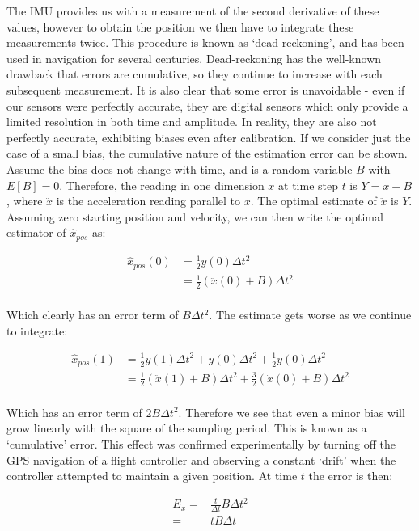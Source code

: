 \documentclass[capstone_report.tex]{subfiles}
\begin{document}
The IMU provides us with a measurement of the second derivative of these values, however to obtain the position we then have to integrate these measurements twice. This procedure is known as `dead-reckoning', and has been used in navigation for several centuries. Dead-reckoning has the well-known drawback that errors are cumulative, so they continue to increase with each subsequent measurement. It is also clear that some error is unavoidable - even if our sensors were perfectly accurate, they are digital sensors which only provide a limited resolution in both time and amplitude. In reality, they are also not perfectly accurate, exhibiting biases even after calibration. If we consider just the case of a small bias, the cumulative nature of the estimation error can be shown.\\ 

Assume the bias does not change with time, and is a random variable $B$ with $E[B]=0$. Therefore, the reading in one dimension $x$ at time step $t$ is $Y=\ddot{x}+B$, where $\ddot{x}$ is the acceleration reading parallel to $x$. The optimal estimate of $\ddot{x}$ is $Y$. Assuming zero starting position and velocity, we can then write the optimal estimator of $\hat{x}_{pos}$ as:

\begin{align*}
	\hat{x}_{pos}(0)&=\frac{1}{2}y(0)\Delta t^2\\
	&=\frac{1}{2}(\ddot{x}(0)+B)\Delta t^2\\
\end{align*}

Which clearly has an error term of $B\Delta t^2$. The estimate gets worse as we continue to integrate:

\begin{align*}
\hat{x}_{pos}(1)&=\frac{1}{2}y(1)\Delta t^2+y(0)\Delta t^2+\frac{1}{2}y(0)\Delta t^2\\
&=\frac{1}{2}(\ddot{x}(1)+B)\Delta t^2+\frac{3}{2}(\ddot{x}(0)+B)\Delta t^2\\   	
\end{align*}

Which has an error term of $2B\Delta t^2$. Therefore we see that even a minor bias will grow linearly with the square of the sampling period. This is known as a `cumulative' error. This effect was confirmed experimentally by turning off the GPS navigation of a flight controller and observing a constant `drift' when the controller attempted to maintain a given position. At time $t$ the error is then:

\begin{align*} 
	E_x=&\frac{t}{\Delta t}B\Delta t^2\\
	=&tB\Delta t
\end{align*}
\end{document}
